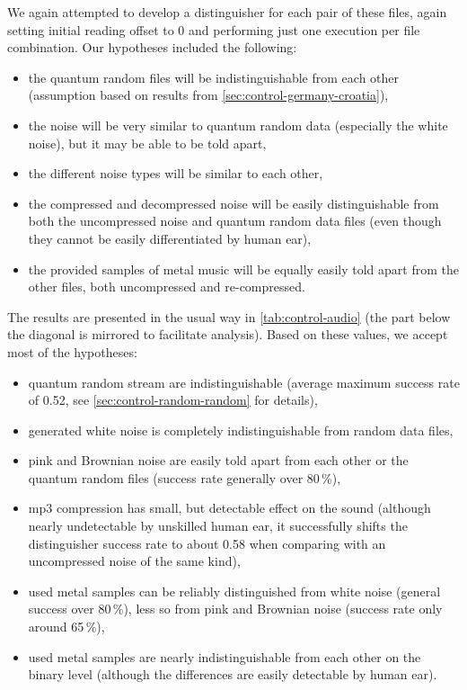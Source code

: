 \documentclass[12pt,twoside]{fithesis2}		%
\renewcommand{\_}{\leavevmode \kern0.0em\vbox{\hrule width0.4em}}
\newcommand{\squarebullet}{\textcolor{black}{\raisebox{0.15em}{\rule{4pt}{4pt}}}}
\newenvironment{myItemize}{
  \begin{itemize}[leftmargin=2em,rightmargin=1em,itemsep=\parskip ,parsep=0em,topsep=0em,partopsep=0em]
  \renewcommand{\labelitemi}{\squarebullet}
  \renewcommand{\labelitemii}{$\diamond$}
}{
  \end{itemize}
}
\begin{document}
We again attempted to develop a distinguisher for each pair of these files, again setting initial reading offset to 0
and performing just one execution per file combination. Our hypotheses included the following:
\begin{myItemize}
\item the quantum random files will be indistinguishable from each other (assumption based on results from 
\autoref{sec:control-germany-croatia}),
\item the noise will be very similar to quantum random data (especially the white noise), but it may be able to be told apart,
\item the different noise types will be similar to each other,
\item the compressed and decompressed noise will be easily distinguishable from both the uncompressed noise and quantum random data
files (even though they cannot be easily differentiated by human ear),
\item the provided samples of metal music will be equally easily told apart from the other files, both uncompressed and re-compressed.
\end{myItemize}

\noindent
The results are presented in the usual way in \autoref{tab:control-audio} (the part below the diagonal is mirrored to
facilitate analysis). Based on these values, we accept most of the hypotheses:
\begin{myItemize}
\item quantum random stream are indistinguishable (average maximum success rate of 0.52, see \autoref{sec:control-random-random}
for details),
\item generated white noise is completely indistinguishable from random data files,
\item pink and Brownian noise are easily told apart from each other or the quantum random files (success rate generally over 80\,\%),
\item mp3 compression has small, but detectable effect on the sound (although nearly undetectable by unskilled human ear, 
it successfully shifts the distinguisher success rate to about 0.58 when comparing with an uncompressed noise of the same kind),
\item used metal samples can be reliably distinguished from white noise (general success over 80\,\%), 
less so from pink and Brownian noise (success rate only around 65\,\%),
\item used metal samples are nearly indistinguishable from each other on the binary level 
(although the differences are easily detectable by human ear).
\end{myItemize}
\end{document}

